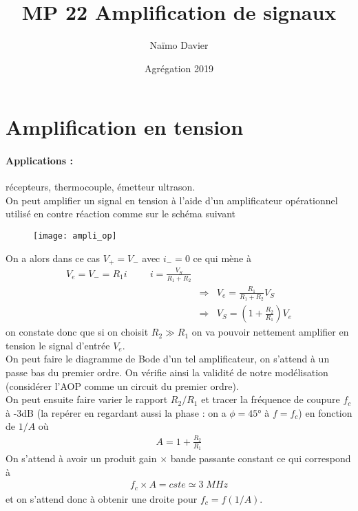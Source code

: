 \documentclass[12pt,prb,aps,epsf]{article}
\begin{document}
	
	\title{MP 22 Amplification de signaux}
		\author{Naïmo Davier}
		\date{Agrégation 2019}
		
	\maketitle
	
	\tableofcontents
	
	\pagebreak
	
		
\section{Amplification en tension}
\paragraph{Applications :} récepteurs, thermocouple, émetteur ultrason.\\

On peut amplifier un signal en tension à l'aide d'un amplificateur opérationnel utilisé en contre réaction comme sur le schéma suivant 
\begin{figure}[h]
	\centering \texttt{[image: ampli\_op]}
\end{figure}

On a alors dans ce cas $V_+=V_-$ avec $i_-=0$ ce qui mène à 
\begin{eqnarray}
V_e = V_- = R_1 i\hspace{1cm} i = \frac{V_S}{R_1+R_2}\\
&\Longrightarrow& V_e = \frac{R_1}{R_1+R_2}V_S\\
&\Longrightarrow& V_S = \left(1 + \frac{R_2}{R_1}\right)V_e
\end{eqnarray}
on constate donc que si on choisit $R_2\gg R_1$ on va pouvoir nettement amplifier en tension le signal d'entrée $V_e$.\\


On peut faire le diagramme de Bode d'un tel amplificateur, on s'attend à un passe bas du premier ordre. On vérifie ainsi la validité de notre modélisation (considérer l'AOP comme un circuit du premier ordre).\\

On peut ensuite faire varier le rapport $R_2/R_1$ et tracer la fréquence de coupure $f_c$ à -3dB (la repérer en regardant aussi la phase : on a $\phi = 45$° à $f=f_c$) en fonction de $1/A$ où 
\begin{eqnarray}
A = 1 + \frac{R_2}{R_1}
\end{eqnarray}
On s'attend à avoir un produit gain $\times$ bande passante constant ce qui correspond à 
\begin{eqnarray}
f_c \times A = cste \simeq 3\;MHz
\end{eqnarray}
et on s'attend donc à obtenir une droite pour $f_c = f(1/A)$.\\
\end{document}

